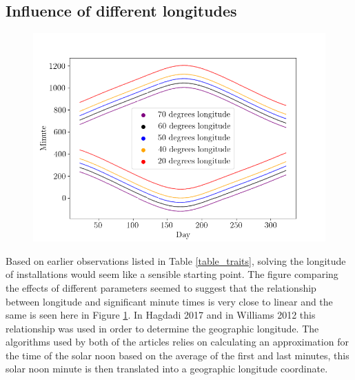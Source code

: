 \newpage

\subsection{Influence of different longitudes}
\label{section_different_longitudes}

\begin{figure}[ht!]
\centering
\includegraphics[width=1\linewidth]{pics/poa_var_lon}
\label{fig-poa_var_lon2}
\end{figure}

\noindent Based on earlier observations listed in Table \ref{table_traits}, solving the longitude of installations would seem like a sensible starting point. The figure comparing the effects of different parameters seemed to suggest that the relationship between longitude and significant minute times is very close to linear and the same is seen here in Figure \ref{fig-poa_var_lon2}. In Hagdadi 2017 \cite{navid_australian_article} and in Williams 2012 \cite{older_solar_solver_article} this relationship was used in order to determine the geographic longitude. The algorithms used by both of the articles relies on calculating an approximation for the time of the solar noon based on the average of the first and last minutes, this solar noon minute is then translated into a geographic longitude coordinate.





